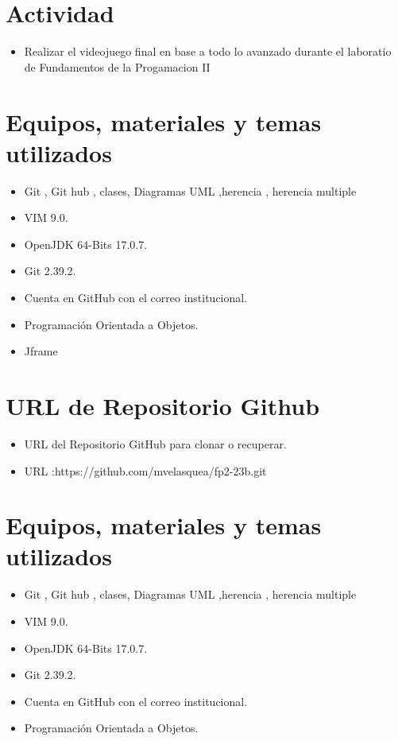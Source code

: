 \documentclass{article}
\begin{document}
	\section{Actividad}
	\begin{itemize}		
		\item Realizar el videojuego final en base a todo lo avanzado durante el laboratio de Fundamentos de la Progamacion II
		
		\end{itemize}
	\section{Equipos, materiales y temas utilizados}
	\begin{itemize}
		\item Git , Git hub , clases, Diagramas UML ,herencia , herencia multiple
		\item VIM 9.0.
		\item OpenJDK 64-Bits 17.0.7.
		\item Git 2.39.2.
		\item Cuenta en GitHub con el correo institucional.
		\item Programación Orientada a Objetos.
		\item Jframe
	\end{itemize}
	
	\section{URL de Repositorio Github}
	\begin{itemize}
		\item URL del Repositorio GitHub para clonar o recuperar.
			\item URL :https://github.com/mvelasquea/fp2-23b.git
\end{itemize}
	\section{Equipos, materiales y temas utilizados}
	\begin{itemize}
		\item Git , Git hub , clases, Diagramas UML ,herencia , herencia multiple
		\item VIM 9.0.
		\item OpenJDK 64-Bits 17.0.7.
		\item Git 2.39.2.
		\item Cuenta en GitHub con el correo institucional.
		\item Programación Orientada a Objetos.
	\end{itemize}
	
\end{document}
